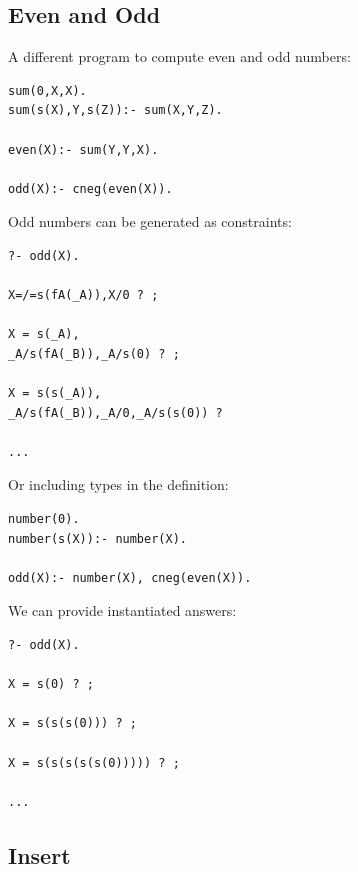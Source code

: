 \documentclass{tlp}
\begin{document}
\subsection*{Even and Odd}

A different program to compute even and odd numbers:
\begin{small}
\begin{verbatim}
sum(0,X,X).
sum(s(X),Y,s(Z)):- sum(X,Y,Z).

even(X):- sum(Y,Y,X).

odd(X):- cneg(even(X)).
\end{verbatim}
\end{small}

Odd numbers can be generated as constraints:
\begin{small}
\begin{verbatim}
?- odd(X).

X=/=s(fA(_A)),X/0 ? ;

X = s(_A),
_A/s(fA(_B)),_A/s(0) ? ;

X = s(s(_A)),
_A/s(fA(_B)),_A/0,_A/s(s(0)) ? 

...
\end{verbatim}
\end{small}

Or including types in the definition:
\begin{small}
\begin{verbatim}
number(0).
number(s(X)):- number(X).

odd(X):- number(X), cneg(even(X)).
\end{verbatim}
\end{small}

We can provide instantiated answers:
\begin{small}
\begin{verbatim}
?- odd(X).

X = s(0) ? ;

X = s(s(s(0))) ? ;

X = s(s(s(s(s(0))))) ? ;

...
\end{verbatim}
\end{small}

\subsection*{Insert}
\end{document}
